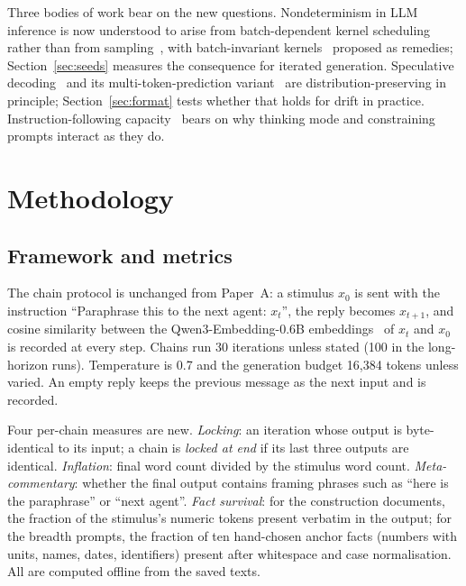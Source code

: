 \documentclass[11pt]{article}
\begin{document}
Three bodies of work bear on the new questions. Nondeterminism in LLM
inference is now understood to arise from batch-dependent kernel
scheduling rather than from sampling~\citep{he2025nondeterminism}, with
batch-invariant kernels~\citep{zhang2025deterministic,zhao2026corun}
proposed as remedies; Section~\ref{sec:seeds} measures the consequence for
iterated generation. Speculative decoding~\citep{leviathan2023speculative,
chen2023speculative} and its multi-token-prediction
variant~\citep{gloeckle2024multitoken,deepseek2024v3} are
distribution-preserving in principle; Section~\ref{sec:format} tests
whether that holds for drift in practice. Instruction-following
capacity~\citep{jaroslawicz2025ifscale} bears on why thinking mode and
constraining prompts interact as they do.

\section{Methodology}
\label{sec:method}

\subsection{Framework and metrics}
\label{sec:framework}

The chain protocol is unchanged from Paper~A: a stimulus $x_0$ is sent with
the instruction ``Paraphrase this to the next agent: $x_t$'', the reply
becomes $x_{t+1}$, and cosine similarity between the Qwen3-Embedding-0.6B
embeddings~\citep{zhang2025qwen3embedding} of $x_t$ and $x_0$ is recorded
at every step. Chains run 30 iterations unless stated (100 in the
long-horizon runs). Temperature is 0.7 and the generation budget 16{,}384
tokens unless varied. An empty reply keeps the previous message as the next
input and is recorded.

Four per-chain measures are new. \emph{Locking}: an iteration whose output
is byte-identical to its input; a chain is \emph{locked at end} if its last
three outputs are identical. \emph{Inflation}: final word count divided by
the stimulus word count. \emph{Meta-commentary}: whether the final output
contains framing phrases such as ``here is the paraphrase'' or ``next
agent''. \emph{Fact survival}: for the construction documents, the fraction
of the stimulus's numeric tokens present verbatim in the output; for the
breadth prompts, the fraction of ten hand-chosen anchor facts (numbers with
units, names, dates, identifiers) present after whitespace and case
normalisation. All are computed offline from the saved texts.
\end{document}
